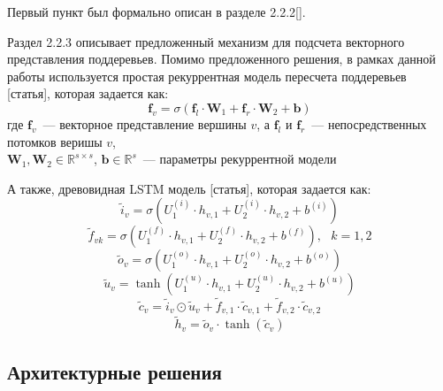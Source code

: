 Первый пункт был формально описан в разделе 2.2.2[].

Раздел 2.2.3 описывает предложенный механизм для подсчета векторного представления поддеревьев.
Помимо предложенного решения, в рамках данной работы используется простая рекуррентная модель пересчета поддеревьев [статья], которая задается как:
$$\pmb{f}_v = \sigma(\pmb{f}_l \cdot \pmb{W}_1 + \pmb{f}_r \cdot \pmb{W}_2 + \pmb{b})$$
где $\pmb{f}_v$~--- векторное представление вершины $v$, а $\pmb{f}_l$ и $\pmb{f}_r$~--- непосредственных
потомков веришы $v$,\\
$\pmb{W}_1, \pmb{W}_2 \in \mathbb{R}^{s \times s}$,
$\pmb{b} \in \mathbb{R}^s$~--- параметры рекуррентной модели

А также, древовидная LSTM модель [статья], которая задается как:
$$\tilde{i}_v=\sigma \left( U_1^{(i)} \cdot h_{v,1} + U_2^{(i)} \cdot h_{v,2} + b^{(i)} \right)$$
$$\tilde{f}_{vk}=\sigma \left( U_1^{(f)} \cdot h_{v,1} + U_2^{(f)} \cdot h_{v,2} + b^{(f)} \right),\text{ }k=1,2$$
$$\tilde{o}_{v}=\sigma \left( U_1^{(o)} \cdot h_{v,1} + U_2^{(o)} \cdot h_{v,2} + b^{(o)} \right)$$
$$\tilde{u}_{v}=\tanh \left( U_1^{(u)} \cdot h_{v,1} + U_2^{(u)} \cdot h_{v,2} + b^{(u)} \right)$$
$$\tilde{c}_v=\tilde{i}_v \odot \tilde{u}_v + \tilde{f}_{v,1} \cdot \tilde{c}_{v, 1} + \tilde{f}_{v,2} \cdot \tilde{c}_{v, 2}$$
$$\tilde{h}_v=\tilde{o}_v \cdot \tanh(\tilde{c}_v)$$

\subsection{Архитектурные решения}
 